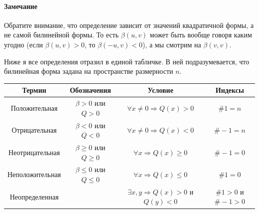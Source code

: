 \paragraph{Замечание}

Обратите внимание, что определение зависит от значений квадратичной формы, а не самой билинейной формы.
То есть $\beta(u,v)$ может быть вообще говоря каким угодно (если $\beta(u, v) >0$, то $\beta(-u, v)< 0$), а мы смотрим на $\beta(v, v)$.

Ниже я все определения отразил в единой табличке.
В ней подразумевается, что билинейная форма задана на пространстве размерности $n$.
\begin{center}
\begin{tabular}{|c|c|c|c|}
\hline
{\bf Термин}&{\bf Обозначения}&{\bf Условие}&{\bf Индексы}\\
\hline
{Положительная}&{$\beta>0$ или $Q>0$}&{$\forall x\neq 0\Rightarrow Q(x) > 0$}&{$\# 1 = n$}\\
\hline
{Отрицательная}&{$\beta<0$ или $Q<0$}&{$\forall x\neq 0\Rightarrow Q(x) < 0$}&{$\#-1 = n$}\\
\hline
{Неотрицательная}&{$\beta\geqslant0$ или $Q\geqslant0$}&{$\forall x\Rightarrow Q(x) \geqslant 0$}&{$\#-1 = 0$}\\
\hline
{Неположительная}&{$\beta\leqslant0$ или $Q\leqslant0$}&{$\forall x\Rightarrow Q(x) \leqslant 0$}&{$\#1 = 0$}\\
\hline
{Неопределенная}&{}&{$\exists x, y\Rightarrow Q(x) > 0$ и $Q(y)<0$}&{$\#1>0$ и $\#-1>0$}\\
\hline
\end{tabular}
\end{center}

